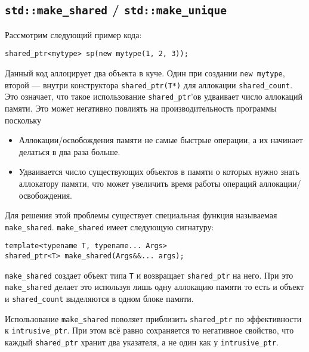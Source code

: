 \subsection{\texttt{std::make_shared} / \texttt{std::make_unique}}
\label{make_shared}

Рассмотрим следующий пример кода:

\begin{verbatim}
shared_ptr<mytype> sp(new mytype(1, 2, 3));
\end{verbatim}

Данный код аллоцирует два объекта в куче. Один при создании \texttt{new mytype}, второй --- внутри конструктора \texttt{shared_ptr(T*)} для аллокации \texttt{shared_count}. Это означает, что такое использование \texttt{shared_ptr}'ов удваивает число аллокаций памяти. Это может негативно повлиять на производительность программы поскольку
\begin{itemize}
    \item Аллокации/освобождения памяти не самые быстрые операции, а их начинает делаться в два раза больше.
    \item Удваивается число существующих объектов в памяти о которых нужно знать аллокатору памяти, что может увеличить время работы операций аллокации/освобождения.
\end{itemize}

Для решения этой проблемы существует специальная функция называемая \texttt{make_shared}. \texttt{make_shared} имеет следующую сигнатуру:

\begin{verbatim}
template<typename T, typename... Args>
shared_ptr<T> make_shared(Args&&... args);
\end{verbatim}

\texttt{make_shared} создает объект типа \texttt{T} и возвращает \texttt{shared_ptr} на него. При это \texttt{make_shared} делает это используя лишь одну аллокацию памяти то есть и объект и \texttt{shared_count} выделяются в одном блоке памяти.

Использование \texttt{make_shared} поволяет приблизить \texttt{shared_ptr} по эффективности к \texttt{intrusive_ptr}. При этом всё равно сохраняется то негативное свойство, что каждый \texttt{shared_ptr} хранит два указателя, а не один как у \texttt{intrusive_ptr}.

